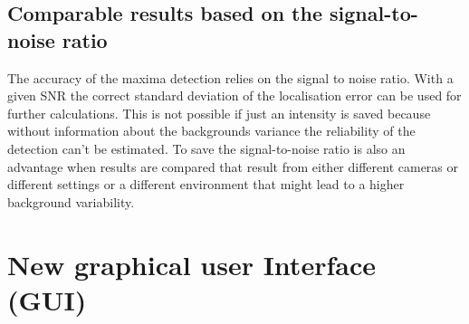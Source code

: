 \subsection{Comparable results based on the signal-to-noise ratio}
The accuracy of the maxima detection relies on the signal to noise ratio. With a given SNR the correct standard deviation of the localisation error can be used for further calculations. This is not possible if just an intensity is saved because without information about the backgrounds variance the reliability of the detection can't be estimated.\newline
To save the signal-to-noise ratio is also an advantage when results are compared that result from either different cameras or different settings or a different environment that might lead to a higher background variability. 


\section{New graphical user Interface (GUI)}
